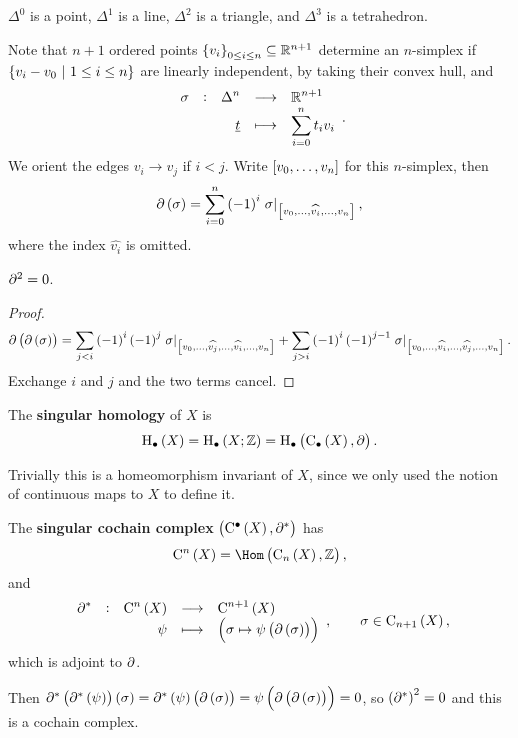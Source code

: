 \begin{example*}
$ \Delta^0 $ is a point, $ \Delta^1 $ is a line, $ \Delta^2 $ is a triangle, and $ \Delta^3 $ is a tetrahedron.
\end{example*}

Note that $ n + 1 $ ordered points $ \cbr{v_i}_{0 \le i \le n} \subseteq \RR^{n + 1} $ determine an $ n $-simplex if $ \cbr{v_i - v_0 \st 1 \le i \le n} $ are linearly independent, by taking their convex hull, and
$$ \function[\sigma]{\Delta^n}{\RR^{n + 1}}{\underline{t}}{\sum_{i = 0}^n t_iv_i}. $$
We orient the edges $ v_i \to v_j $ if $ i < j $. Write $ \sbr{v_0, \dots, v_n} $ for this $ n $-simplex, then
$$ \da\br{\sigma} = \sum_{i = 0}^n \br{-1}^i\eval{\sigma}_{\sbr{v_0, \dots, \widehat{v_i}, \dots, v_n}}, $$
where the index $ \widehat{v_i} $ is omitted.

\pagebreak

\begin{lemma}
$ \partial^2 = 0 $.
\end{lemma}

\begin{proof}
$$ \da\br{\da\br{\sigma}} = \sum_{j < i} \br{-1}^i\br{-1}^j\eval{\sigma}_{\sbr{v_0, \dots, \widehat{v_j}, \dots, \widehat{v_i}, \dots, v_n}} + \sum_{j > i} \br{-1}^i\br{-1}^{j - 1}\eval{\sigma}_{\sbr{v_0, \dots, \widehat{v_i}, \dots, \widehat{v_j}, \dots, v_n}}. $$
Exchange $ i $ and $ j $ and the two terms cancel.
\end{proof}

\begin{definition*}
The \textbf{singular homology} of $ X $ is
$$ \H_\bullet\br{X} = \H_\bullet\br{X; \ZZ} = \H_\bullet\br{\C_\bullet\br{X}, \da}. $$
\end{definition*}

Trivially this is a homeomorphism invariant of $ X $, since we only used the notion of continuous maps to $ X $ to define it.

\begin{definition*}
The \textbf{singular cochain complex} $ \br{\C^\bullet\br{X}, \da^*} $ has
$$ \C^n\br{X} = \Hom\br{\C_n\br{X}, \ZZ}, $$
and
$$ \function[\da^*]{\C^n\br{X}}{\C^{n + 1}\br{X}}{\psi}{\br{\sigma \mapsto \psi\br{\da\br{\sigma}}}}, \qquad \sigma \in \C_{n + 1}\br{X}, $$
which is adjoint to $ \partial $.
\end{definition*}

Then $ \da^*\br{\da^*\br{\psi}}\br{\sigma} = \da^*\br{\psi}\br{\da\br{\sigma}} = \psi\br{\da\br{\da\br{\sigma}}} = 0 $, so $ \br{\da^*}^2 = 0 $ and this is a cochain complex.


